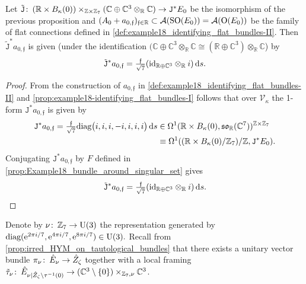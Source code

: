 \documentclass[11pt,a4paper]{scrartcl}
\newcommand*\diff{\mathop{}\!\textup{d}}
\newcommand{\col}{\colon \thinspace}
\newcommand{\e}{\textup{e}}
\newcommand{\diag}{\textup{diag}}
\newcommand{\SO}{\textup{SO}}
\renewcommand{\O}{\textup{O}}
\newcommand{\U}{\textup{U}}
\numberwithin{equation}{section}
\theoremstyle{plain}
\theoremstyle{definition}
\theoremstyle{remark}
\begin{document}
\begin{proposition}\label{prop:example18-a_(0,f)-in-gluing-region}
Let $\tilde{\mathtt{J}} \col (\mathbb{R}\times B_\kappa(0)) \times_{\mathbb{Z}\times \mathbb{Z}_7} (\mathbb{C}\oplus \mathbb{C}^3\otimes_{\mathbb{R}}\mathbb{C}) \to \mathtt{J}^*E_0$ be the isomorphism of the previous proposition and $(A_0+a_{0,\mathfrak{f}})_{\mathfrak{f}\in \mathbb{R}} \subset \mathcal{A}(\SO(E_0)) = \mathcal{A}(\O(E_0))$ be the family of flat connections defined in \autoref{def:example18_identifying_flat_bundles-II}. Then $\tilde{\mathtt{J}}^*a_{0,\mathfrak{f}}$ is given (under the identification $(\mathbb{C}\oplus \mathbb{C}^3\otimes_\mathbb{R} \mathbb{C} \cong (\mathbb{R}\oplus \mathbb{C}^3)\otimes_{\mathbb{R}} \mathbb{C}$) by \[ \tilde{\mathtt{J}}^*a_{0,\mathfrak{f}} = \tfrac{\mathfrak{f}}{\sqrt{7}} (\textup{id}_{\mathbb{R} \oplus \mathbb{C}^3} \otimes_\mathbb{R} i  )  \diff s. \] 
\end{proposition}

\begin{proof}
From the construction of $a_{0,\mathfrak{f}}$ in \autoref{def:example18_identifying_flat_bundles-II} and \autoref{prop:example18-identifying_flat_bundles-I} follows that over $\mathcal{V}_\kappa$ the 1-form $\mathtt{J}^*a_{0,\mathfrak{f}}$ is given by \begin{align*}
\mathtt{J}^*a_{0,\mathfrak{f}} = \tfrac{\mathfrak{f}}{\sqrt{7}} \diag\big(i,i,i,-i,i,i,i\big) \diff s &\in \Omega^1(\mathbb{R}\times B_\kappa(0),\mathfrak{so}_\mathbb{R}(\mathbb{C}^7))^{\mathbb{Z}\times \mathbb{Z}_7} \\
& \equiv \Omega^1((\mathbb{R}\times B_{\kappa}(0)/\mathbb{Z}_7)/\mathbb{Z},\mathtt{J}^*E_0). 
\end{align*}
Conjugating $\mathtt{J}^*a_{0,\mathfrak{f}}$ by $F$ defined in \autoref{prop:Example18_bundle_around_singular_set} gives \[ \tilde{\mathtt{J}}^*a_{0,\mathfrak{f}} = \tfrac{\mathfrak{f}}{\sqrt{7}} (\textup{id}_{\mathbb{R} \oplus \mathbb{C}^3} \otimes_\mathbb{R} i  )  \diff s. \qedhere \]
\end{proof}

Denote by $\nu \col \mathbb{Z}_7 \to \U(3)$ the representation generated by $\textup{diag}(\e^{2\pi i/7},\e^{4\pi i/7},\e^{8\pi i/7}) \in \U(3).$ Recall from \autoref{prop:irred_HYM_on_tautological_bundles} that there exists a unitary vector bundle $\pi_\nu \col \hat{E}_\nu \to \hat{Z}_\zeta$ together with a local framing $\tilde{\tau}_\nu \col \hat{E}_{\nu\vert \hat{Z}_\zeta \setminus \tau^{-1}(0)} \to (\mathbb{C}^3\setminus\{0\}) \times_{\mathbb{Z}_7, \nu} \mathbb{C}^3$.
\end{document}
